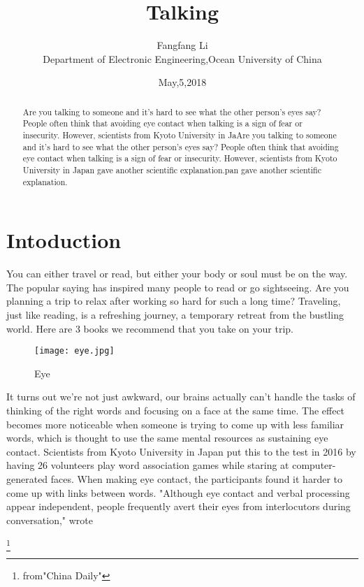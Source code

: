 \documentclass[twocolumn]{article}
\newcommand{\upcite}[1]{\textsuperscript{\textsuperscript{\cite{#1}}}}
\begin{document}
\title{Talking}
\author{Fangfang Li\\[4pt]
Department of Electronic Engineering,Ocean University of China}
\date{May,5,2018}
\maketitle
\begin{abstract}
Are you talking to someone and it's hard to see what the other person's eyes say? People often think that avoiding eye contact when talking is a sign of fear or insecurity. However, scientists from Kyoto University in JaAre you talking to someone and it's hard to see what the other person's eyes say? People often think that avoiding eye contact when talking is a sign of fear or insecurity. However, scientists from Kyoto University in Japan gave another scientific explanation.pan gave another scientific explanation.
\end{abstract}
\section{Intoduction}
You can either travel or read, but either your body or soul must be on the way. The popular saying has inspired many people to read or go sightseeing. Are you planning a trip to relax after working so hard for such a long time? Traveling, just like reading, is a refreshing journey, a temporary retreat from the bustling world. Here are 3 books we recommend that you take on your trip.
\begin{figure}[htbp]
\centering
\texttt{[image: eye.jpg]}
\caption{Eye}
\label{1}
\end{figure}
\par It turns out we're not just awkward, our brains actually can't handle the tasks of thinking of the right words and focusing on a face at the same time.\upcite{higham1994bibtex} The effect becomes more noticeable when someone is trying to come up with less familiar words, which is thought to use the same mental resources as sustaining eye contact. Scientists from Kyoto University in Japan put this to the test in 2016 by having 26 volunteers play word association games while staring at computer-generated faces. When making eye contact, the participants found it harder to come up with links between words. "Although eye contact and verbal processing appear independent, people frequently avert their eyes from interlocutors during conversation," wrote
\renewcommand\refname{Reference}
%

\footnote{from"China Daily"}
\end{document}
